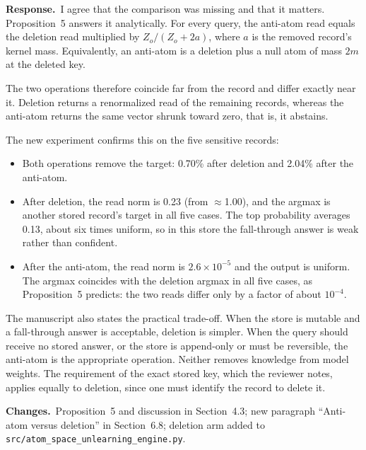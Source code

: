 \documentclass[11pt]{article}
\newcommand{\response}{\par\noindent\textbf{Response.}\ }
\newcommand{\changes}{\par\smallskip\noindent\textbf{Changes.}\ }
\begin{document}
\response I agree that the comparison was missing and that it matters. Proposition~5 answers it analytically. For every query, the anti-atom read equals the deletion read multiplied by $Z_o/(Z_o+2a)$, where $a$ is the removed record's kernel mass. Equivalently, an anti-atom is a deletion plus a null atom of mass $2m$ at the deleted key.

The two operations therefore coincide far from the record and differ exactly near it. Deletion returns a renormalized read of the remaining records, whereas the anti-atom returns the same vector shrunk toward zero, that is, it abstains.

The new experiment confirms this on the five sensitive records:
\begin{itemize}
\item Both operations remove the target: 0.70\% after deletion and 2.04\% after the anti-atom.
\item After deletion, the read norm is 0.23 (from $\approx$1.00), and the argmax is another stored record's target in all five cases. The top probability averages 0.13, about six times uniform, so in this store the fall-through answer is weak rather than confident.
\item After the anti-atom, the read norm is $2.6\times10^{-5}$ and the output is uniform. The argmax coincides with the deletion argmax in all five cases, as Proposition~5 predicts: the two reads differ only by a factor of about $10^{-4}$.
\end{itemize}
The manuscript also states the practical trade-off. When the store is mutable and a fall-through answer is acceptable, deletion is simpler. When the query should receive no stored answer, or the store is append-only or must be reversible, the anti-atom is the appropriate operation. Neither removes knowledge from model weights. The requirement of the exact stored key, which the reviewer notes, applies equally to deletion, since one must identify the record to delete it.

\changes Proposition~5 and discussion in Section~4.3; new paragraph ``Anti-atom versus deletion'' in Section~6.8; deletion arm added to \texttt{src/atom\_space\_unlearning\_engine.py}.
\end{document}
